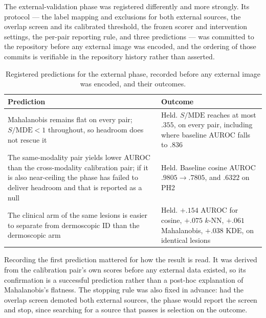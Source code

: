 \documentclass[11pt,a4paper]{article}
\begin{document}
The external-validation phase was registered differently and more strongly. Its
protocol --- the label mapping and exclusions for both external sources, the
overlap screen and its calibrated threshold, the frozen scorer and intervention
settings, the per-pair reporting rule, and three predictions --- was committed
to the repository before any external image was encoded, and the ordering of
those commits is verifiable in the repository history rather than asserted.

\begin{table}[t]
\centering
\caption{Registered predictions for the external phase, recorded before any external image was encoded, and their outcomes.}
\label{tab:prereg}
\small
\begin{tabular}{p{5.4cm}p{7.4cm}}
\toprule
Prediction & Outcome\\
\midrule
Mahalanobis remains flat on every pair; $S/\mathrm{MDE}<1$ throughout, so headroom does not rescue it &
Held. $S/\mathrm{MDE}$ reaches at most $.355$, on every pair, including where baseline AUROC falls to $.836$\\
\addlinespace
The same-modality pair yields lower AUROC than the cross-modality calibration pair; if it is also near-ceiling the phase has failed to deliver headroom and that is reported as a null &
Held. Baseline cosine AUROC $.9805\rightarrow.7805$, and $.6322$ on PH2\\
\addlinespace
The clinical arm of the same lesions is easier to separate from dermoscopic ID than the dermoscopic arm &
Held. $+.154$ AUROC for cosine, $+.075$ $k$-NN, $+.061$ Mahalanobis, $+.038$ KDE, on identical lesions\\
\bottomrule
\end{tabular}
\end{table}

Recording the first prediction mattered for how the result is read. It was
derived from the calibration pair's own scores before any external data
existed, so its confirmation is a successful prediction rather than a
post-hoc explanation of Mahalanobis's flatness. The stopping rule was also
fixed in advance: had the overlap screen demoted both external sources, the
phase would report the screen and stop, since searching for a source that
passes is selection on the outcome.
\end{document}
